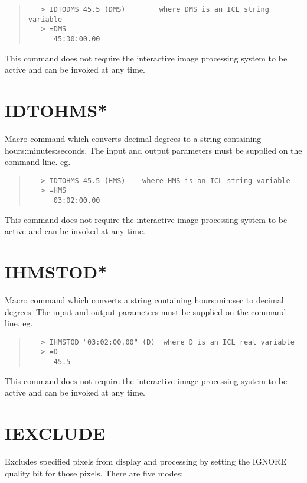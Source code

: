 \documentclass{book}
\renewcommand{\_}{{\tt\char'137}}     %
\begin{document}
\begin{quote}\begin{verbatim}
   > IDTODMS 45.5 (DMS)        where DMS is an ICL string variable
   > =DMS
      45:30:00.00
 \end{verbatim}\end{quote}
This command does not require the interactive image processing
system to be active and can be invoked at any time.
 
\section{IDTOHMS*}
Macro command which converts decimal degrees to a string containing
hours:minutes:seconds. The input and output parameters must be
supplied on the command line. eg.
 
\begin{quote}\begin{verbatim}
   > IDTOHMS 45.5 (HMS)    where HMS is an ICL string variable
   > =HMS
      03:02:00.00
 \end{verbatim}\end{quote}
This command does not require the interactive image processing
system to be active and can be invoked at any time.
 
\section{IHMSTOD*}
Macro command which converts a string containing hours:min:sec to
decimal degrees. The input and output parameters must be supplied
on the command line. eg.
 
\begin{quote}\begin{verbatim}
   > IHMSTOD "03:02:00.00" (D)  where D is an ICL real variable
   > =D
      45.5
 \end{verbatim}\end{quote}
This command does not require the interactive image processing
system to be active and can be invoked at any time.
 
\section{IEXCLUDE}
Excludes specified pixels from display and processing by setting
the IGNORE quality bit for those pixels. There are five modes:
 
\end{document}
